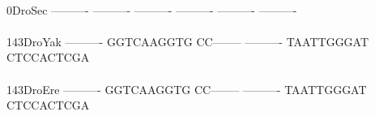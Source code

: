 \documentclass[11pt,twoside,reqno,a4paper]{article}
\begin{document}
{\hspace*{4\charwidth}\hspace*{7\charwidth}\hspace*{1\charwidth}\hspace*{1\charwidth}\hspace*{1\charwidth}\hspace*{1\charwidth}\hspace*{1\charwidth}\hspace*{1\charwidth}\\
0\hspace*{3\charwidth}DroSec	----------	----------	----------	----------	----------	----------	\\
\hspace*{4\charwidth}\hspace*{7\charwidth}\hspace*{1\charwidth}\hspace*{1\charwidth}\hspace*{1\charwidth}\hspace*{1\charwidth}\hspace*{1\charwidth}\hspace*{1\charwidth}\\
143\hspace*{1\charwidth}DroYak	----------	GGTCAAGGTG	CC--------	----------	TAATTGGGAT	CTCCACTCGA	\\
\hspace*{4\charwidth}\hspace*{7\charwidth}\hspace*{1\charwidth}\hspace*{1\charwidth}\hspace*{1\charwidth}\hspace*{1\charwidth}\hspace*{1\charwidth}\hspace*{1\charwidth}\\
143\hspace*{1\charwidth}DroEre	----------	GGTCAAGGTG	CC--------	----------	TAATTGGGAT	CTCCACTCGA	\\
\hspace*{4\charwidth}\hspace*{7\charwidth}\hspace*{1\charwidth}\hspace*{1\charwidth}\hspace*{1\charwidth}\hspace*{1\charwidth}\hspace*{1\charwidth}\hspace*{1\charwidth}\\
}
\end{document}
